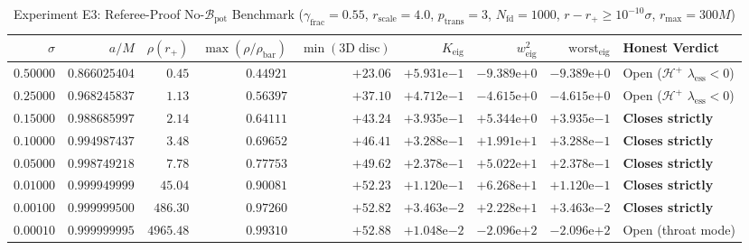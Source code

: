 \documentclass[11pt, a4paper]{article}
\theoremstyle{remark}
\begin{document}
\begin{table}[h]
\centering
\caption{Experiment E3: Referee-Proof No-$\mathcal{B}_{\mathrm{pot}}$ Benchmark ($\gamma_{\mathrm{frac}} = 0.55$, $r_{\mathrm{scale}} = 4.0$, $p_{\mathrm{trans}} = 3$, $N_{\mathrm{fd}} = 1000$, $r - r_+ \ge 10^{-10}\sigma$, $r_{\max} = 300M$)}
\label{tab:referee-benchmark}
\small
\begin{tabular}{@{}rrrrrrrrl@{}}
\toprule
$\sigma$ & $a/M$ & $\rho(r_+)$ & $\max(\rho/\rho_{\mathrm{bar}})$ & $\min(\mathrm{3D\;disc})$ & $K_{\mathrm{eig}}$ & $w^2_{\mathrm{eig}}$ & $\mathrm{worst}_{\mathrm{eig}}$ & Honest Verdict \\
\midrule
$0.50000$ & $0.866025404$ & $0.45$ & $0.44921$ & $+23.06$ & $+5.931\mathrm{e}{-1}$ & $-9.389\mathrm{e}{+0}$ & $-9.389\mathrm{e}{+0}$ & Open ($\mathcal{H}^+$ $\lambda_{\mathrm{ess}} < 0$) \\
$0.25000$ & $0.968245837$ & $1.13$ & $0.56397$ & $+37.10$ & $+4.712\mathrm{e}{-1}$ & $-4.615\mathrm{e}{+0}$ & $-4.615\mathrm{e}{+0}$ & Open ($\mathcal{H}^+$ $\lambda_{\mathrm{ess}} < 0$) \\
$0.15000$ & $0.988685997$ & $2.14$ & $0.64111$ & $+43.24$ & $+3.935\mathrm{e}{-1}$ & $+5.344\mathrm{e}{+0}$ & $+3.935\mathrm{e}{-1}$ & \textbf{Closes strictly} \\
$0.10000$ & $0.994987437$ & $3.48$ & $0.69652$ & $+46.41$ & $+3.288\mathrm{e}{-1}$ & $+1.991\mathrm{e}{+1}$ & $+3.288\mathrm{e}{-1}$ & \textbf{Closes strictly} \\
$0.05000$ & $0.998749218$ & $7.78$ & $0.77753$ & $+49.62$ & $+2.378\mathrm{e}{-1}$ & $+5.022\mathrm{e}{+1}$ & $+2.378\mathrm{e}{-1}$ & \textbf{Closes strictly} \\
$0.01000$ & $0.999949999$ & $45.04$ & $0.90081$ & $+52.23$ & $+1.120\mathrm{e}{-1}$ & $+6.268\mathrm{e}{+1}$ & $+1.120\mathrm{e}{-1}$ & \textbf{Closes strictly} \\
$0.00100$ & $0.999999500$ & $486.30$ & $0.97260$ & $+52.82$ & $+3.463\mathrm{e}{-2}$ & $+2.228\mathrm{e}{+1}$ & $+3.463\mathrm{e}{-2}$ & \textbf{Closes strictly} \\
$0.00010$ & $0.999999995$ & $4965.48$ & $0.99310$ & $+52.88$ & $+1.048\mathrm{e}{-2}$ & $-2.096\mathrm{e}{+2}$ & $-2.096\mathrm{e}{+2}$ & Open (throat mode) \\
\bottomrule
\end{tabular}
\end{table}
\end{document}
